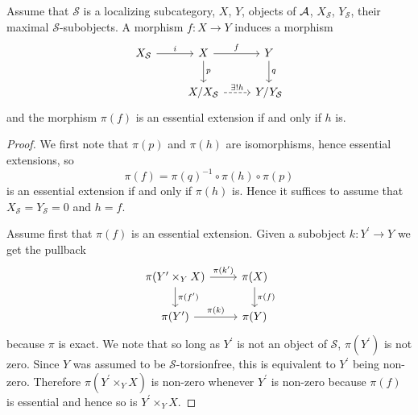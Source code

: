 \documentclass[dissertation.tex]{subfiles}
\begin{document}
\begin{lem}\label{lem5}
  Assume that $\mathcal{S}$ is a localizing subcategory, $X$, $Y$, objects of $\mathcal{A}$, $X_\mathcal{S}$, $Y_\mathcal{S}$, their maximal $\mathcal{S}$-subobjects.
  A morphism $f \colon X \rightarrow Y$ induces a morphism
  $$\begin{tikzcd}
    X_\mathcal{S} \arrow{r}{i} & X \arrow{r}{f}\arrow{d}{p} & Y\arrow{d}{q}\\
    & X/X_\mathcal{S} \arrow[dashed]{r}{\exists !h} & Y/Y_\mathcal{S}
  \end{tikzcd}$$
  and the morphism $\pi(f)$ is an essential extension if and only if $h$ is.

  \begin{proof}
    We first note that $\pi(p)$ and $\pi(h)$ are isomorphisms, hence essential extensions, so 
    $$\pi(f) = \pi(q)^{-1} \circ \pi(h) \circ \pi(p)$$
    is an essential extension if and only if $\pi(h)$ is.
    Hence it suffices to assume that $X_\mathcal{S} = Y_\mathcal{S} = 0$ and $h = f$.
    
    Assume first that $\pi(f)$ is an essential extension.
    Given a subobject $k : Y^\prime \rightarrow Y$ we get the pullback 
    $$\begin{tikzcd}
      \pi(Y^\prime \times_Y X) \arrow{r}{\pi(k^\prime)}\arrow{d}{\pi(f^\prime)} & \pi(X) \arrow{d}{\pi(f)}\\
      \pi(Y^\prime) \arrow{r}{\pi(k)} &\pi(Y)
    \end{tikzcd}$$
    because $\pi$ is exact.
    We note that so long as $Y^\prime$ is not an object of $\mathcal{S}$, $\pi(Y^\prime)$ is not zero.
    Since $Y$ was assumed to be $\mathcal{S}$-torsionfree, this is equivalent to $Y^\prime$ being non-zero.
    Therefore $\pi(Y^\prime \times_Y X)$ is non-zero whenever $Y^\prime$ is non-zero because $\pi(f)$ is essential and hence so is $Y^\prime \times_Y X$.
    

\end{proof}
\end{lem}
\end{document}
